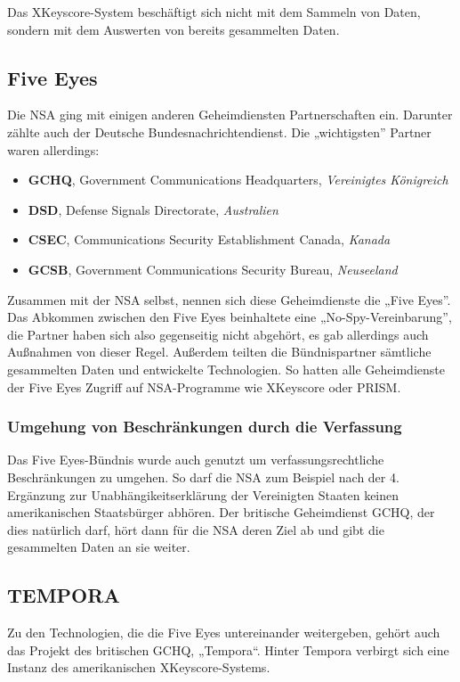 \documentclass[12pt,a4paper]{scrartcl}
\begin{document}
Das XKeyscore-System beschäftigt sich nicht mit dem Sammeln von Daten, sondern mit dem Auswerten von bereits gesammelten Daten.

\subsection{Five Eyes}
Die NSA ging mit einigen anderen Geheimdiensten Partnerschaften ein. Darunter zählte auch der Deutsche Bundesnachrichtendienst. Die „wichtigsten” Partner waren allerdings:
\begin{itemize}
\item \textbf{GCHQ}, Government Communications Headquarters, \emph{Vereinigtes Königreich}
\item \textbf{DSD}, Defense Signals Directorate, \emph{Australien}
\item \textbf{CSEC}, Communications Security Establishment Canada, \emph{Kanada}
\item \textbf{GCSB}, Government Communications Security Bureau, \emph{Neuseeland}
\end{itemize}

Zusammen mit der NSA selbst, nennen sich diese Geheimdienste die „Five Eyes”.
Das Abkommen zwischen den Five Eyes beinhaltete eine „No-Spy-Vereinbarung”, die Partner haben sich also gegenseitig nicht abgehört, es gab allerdings auch Außnahmen von dieser Regel. Außerdem teilten die Bündnispartner sämtliche gesammelten Daten und entwickelte Technologien. So hatten alle Geheimdienste der Five Eyes Zugriff auf NSA-Programme wie XKeyscore oder PRISM.

\subsubsection{Umgehung von Beschränkungen durch die Verfassung}
Das Five Eyes-Bündnis wurde auch genutzt um verfassungsrechtliche Beschränkungen zu umgehen. So darf die NSA zum Beispiel nach der 4. Ergänzung zur Unabhängikeitserklärung der Vereinigten Staaten keinen amerikanischen Staatsbürger abhören. Der britische Geheimdienst GCHQ, der dies natürlich darf, hört dann für die NSA deren Ziel ab und gibt die gesammelten Daten an sie weiter.

\subsection{TEMPORA}
Zu den Technologien, die die Five Eyes untereinander weitergeben, gehört auch das Projekt des britischen GCHQ, „Tempora“. Hinter Tempora verbirgt sich eine Instanz des amerikanischen XKeyscore-Systems.
\end{document}
